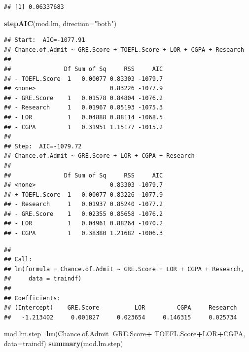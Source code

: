 \documentclass[11pt,]{article}
\newenvironment{Shaded}{\begin{snugshade}}{\end{snugshade}}
\newcommand{\DataTypeTok}[1]{\textcolor[rgb]{0.13,0.29,0.53}{#1}}
\newcommand{\KeywordTok}[1]{\textcolor[rgb]{0.13,0.29,0.53}{\textbf{#1}}}
\newcommand{\NormalTok}[1]{#1}
\newcommand{\OperatorTok}[1]{\textcolor[rgb]{0.81,0.36,0.00}{\textbf{#1}}}
\newcommand{\StringTok}[1]{\textcolor[rgb]{0.31,0.60,0.02}{#1}}
\begin{document}
\begin{verbatim}
## [1] 0.06337683
\end{verbatim}

\begin{Shaded}
\begin{Highlighting}[]
\KeywordTok{stepAIC}\NormalTok{(mod.lm, }\DataTypeTok{direction=}\StringTok{"both"}\NormalTok{)}
\end{Highlighting}
\end{Shaded}

\begin{verbatim}
## Start:  AIC=-1077.91
## Chance.of.Admit ~ GRE.Score + TOEFL.Score + LOR + CGPA + Research
## 
##               Df Sum of Sq     RSS     AIC
## - TOEFL.Score  1   0.00077 0.83303 -1079.7
## <none>                     0.83226 -1077.9
## - GRE.Score    1   0.01578 0.84804 -1076.2
## - Research     1   0.01967 0.85193 -1075.3
## - LOR          1   0.04888 0.88114 -1068.5
## - CGPA         1   0.31951 1.15177 -1015.2
## 
## Step:  AIC=-1079.72
## Chance.of.Admit ~ GRE.Score + LOR + CGPA + Research
## 
##               Df Sum of Sq     RSS     AIC
## <none>                     0.83303 -1079.7
## + TOEFL.Score  1   0.00077 0.83226 -1077.9
## - Research     1   0.01937 0.85240 -1077.2
## - GRE.Score    1   0.02355 0.85658 -1076.2
## - LOR          1   0.04961 0.88264 -1070.2
## - CGPA         1   0.38380 1.21682 -1006.3
\end{verbatim}

\begin{verbatim}
## 
## Call:
## lm(formula = Chance.of.Admit ~ GRE.Score + LOR + CGPA + Research, 
##     data = traindf)
## 
## Coefficients:
## (Intercept)    GRE.Score          LOR         CGPA     Research  
##   -1.213402     0.001827     0.023654     0.146315     0.025734
\end{verbatim}

\begin{Shaded}
\begin{Highlighting}[]
\NormalTok{mod.lm.step=}\KeywordTok{lm}\NormalTok{(Chance.of.Admit}\OperatorTok{~}\NormalTok{GRE.Score}\OperatorTok{+}
\StringTok{                 }\NormalTok{TOEFL.Score}\OperatorTok{+}\NormalTok{LOR}\OperatorTok{+}\NormalTok{CGPA, }\DataTypeTok{data=}\NormalTok{traindf)}
\KeywordTok{summary}\NormalTok{(mod.lm.step)}
\end{Highlighting}
\end{Shaded}
\end{document}
